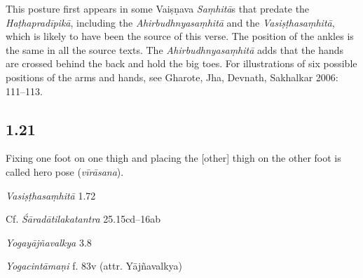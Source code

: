 \begin{ekdosis}
\begin{philcomm}[hp01_020]        
This posture first appears in some Vaiṣṇava \emph{Saṃhitā}s that predate the \emph{Haṭhapradīpikā}, including the \emph{Ahirbudhnyasaṃhitā} and the \emph{Vasiṣṭhasaṃhitā}, which is likely to have been the source of this verse. The position of the ankles is the same in all the source texts. The \emph{Ahirbudhnyasaṃhitā} adds that the hands are crossed behind the back and hold the big toes. For illustrations of six possible positions of the arms and hands, see Gharote, Jha, Devnath, Sakhalkar 2006: 111–113.
\end{philcomm}

\subsection*{1.21}
\begin{translation}[hp01_021]
 Fixing one foot on one thigh and placing the [other] thigh on the other foot is called hero pose (\emph{vīrāsana}).
\end{translation}

\begin{sources}[hp01_021]
\emph{Vasiṣṭhasaṃhitā} 1.72

\begin{versinnote}
\end{versinnote}

Cf. \emph{Śāradātilakatantra} 25.15cd–16ab

\begin{versinnote}
\end{versinnote}

\emph{Yogayājñavalkya} 3.8

\begin{versinnote}
\end{versinnote}

\end{sources}

\begin{testimonia}[hp01_021]
\emph{Yogacintāmaṇi} f. 83v (attr. Yājñavalkya)


\end{testimonia}
\end{ekdosis}
